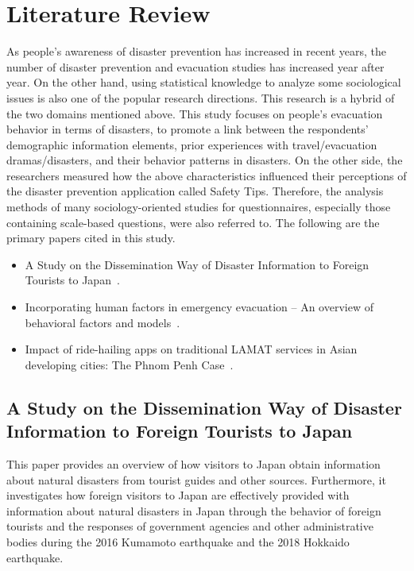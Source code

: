 

\chapter{Literature Review}

As people's awareness of disaster prevention has increased in recent years, the number of disaster prevention and evacuation studies has increased year after year. On the other hand, using statistical knowledge to analyze some sociological issues is also one of the popular research directions. This research is a hybrid of the two domains mentioned above. This study focuses on people's evacuation behavior in terms of disasters, to promote a link between the respondents' demographic information elements, prior experiences with travel/evacuation dramas/disasters, and their behavior patterns in disasters. On the other side, the researchers measured how the above characteristics influenced their perceptions of the disaster prevention application called Safety Tips. Therefore, the analysis methods of many sociology-oriented studies for questionnaires, especially those containing scale-based questions, were also referred to. The following are the primary papers cited in this study.
\begin{itemize}
  \item A Study on the Dissemination Way of Disaster Information to Foreign Tourists to Japan~\cite{ref8}. 
  \item Incorporating human factors in emergency evacuation – An overview of behavioral factors and models~\cite{ref9}.
  \item Impact of ride-hailing apps on traditional LAMAT services in Asian developing cities: The Phnom Penh Case~\cite{ref7}.
\end{itemize}

\section{A Study on the Dissemination Way of Disaster Information to Foreign Tourists to Japan}

This paper provides an overview of how visitors to Japan obtain information about natural disasters from tourist guides and other sources. Furthermore, it investigates how foreign visitors to Japan are effectively provided with information about natural disasters in Japan through the behavior of foreign tourists and the responses of government agencies and other administrative bodies during the 2016 Kumamoto earthquake and the 2018 Hokkaido earthquake.

